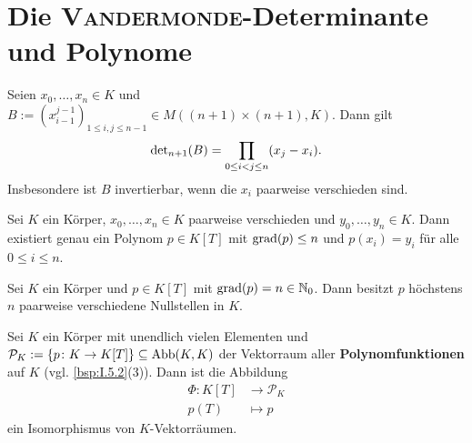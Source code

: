 \newpage
\section{Die \textsc{Vandermonde}-Determinante und Polynome}

\begin{satz}
	\label{satz:I.15.1}
	Seien $x_0,\dots,x_n \in K$ und $B := (x_{i-1}^{j-1})_{1 \leq i,j \leq n-1} \in M((n+1) \times (n+1),K)$.
	Dann gilt 
	\[
		\operatorname{\det\,\!}_{n+1}(B) = \prod_{0 \leq i<j \leq n} (x_j-x_i).
	\]
	Insbesondere ist $B$ invertierbar, wenn die $x_i$ paarweise verschieden sind.
\end{satz}

\setcounter{definition}{2}
\begin{korollar}
	\label{kor:I.15.3}
	Sei $K$ ein Körper, $x_0, \dots, x_n \in K$ paarweise verschieden und $y_0, \dots, y_n \in K$.
	Dann existiert genau ein Polynom $p \in K[T]$ mit $\operatorname{grad}(p) \leq n$ und $p(x_i)=y_i$ für alle $0 \leq i \leq n$.
\end{korollar}

\begin{korollar}
	\label{kor:I.15.4}
	Sei $K$ ein Körper und $p \in K[T]$ mit $\operatorname{grad}(p) = n \in \mathbb{N}_0$.
	Dann besitzt $p$ höchstens $n$ paarweise verschiedene Nullstellen in $K$.
\end{korollar}

\setcounter{definition}{5}
\begin{satz}
	\label{satz:I.15.6}
	Sei $K$ ein Körper mit unendlich vielen Elementen und $\mathcal{P}_K := \{p \colon K \rightarrow K[T]\} \subseteq \operatorname{Abb}(K,K)$ der Vektorraum aller \textbf{Polynomfunktionen} auf $K$ (vgl. \autoref{bsp:I.5.2}(3)). 
	Dann ist die Abbildung
	\begin{align*}
		\Phi \colon K[T] &\longrightarrow \mathcal{P}_K \\
		p(T) &\longmapsto p
	\end{align*}
	ein Isomorphismus von $K$-Vektorräumen.
\end{satz}